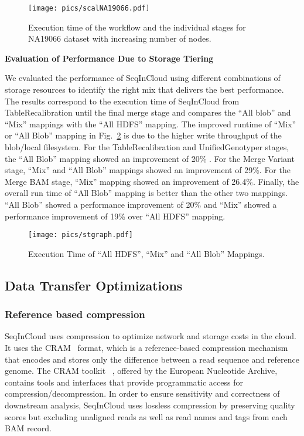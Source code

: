 \begin{figure}[!h]
  \centering
  \texttt{[image: pics/scalNA19066.pdf]}
  \caption{Execution time of the workflow and the individual stages for NA19066 dataset with increasing number of nodes.}
  \label{fig:scalNA19066}
\end{figure}
 
\noindent\textbf{Evaluation of Performance Due to Storage Tiering}

We evaluated the performance of SeqInCloud using different combinations of storage resources to identify the right mix that delivers the best performance.  The results correspond to the
execution time of SeqInCloud from TableRecalibration until the final merge stage and compares the ``All blob'' and ``Mix'' mappings with the ``All HDFS'' mapping.  The improved runtime of ``Mix'' or ``All Blob'' mapping in Fig.~\ref{fig:stgraph} is due to the higher write throughput of the blob/local filesystem.  For the TableRecalibration and UnifiedGenotyper stages, the ``All Blob'' mapping showed an improvement of 20\% . For the Merge Variant stage, ``Mix'' and ``All Blob'' mappings showed an improvement of 29\%. For the Merge BAM stage, ``Mix'' mapping showed an improvement of 26.4\%. Finally, the overall run time of ``All Blob'' mapping is better than the other two mappings. ``All Blob'' showed a performance improvement of 20\% and ``Mix'' showed a performance improvement of 19\% over ``All HDFS'' mapping.

\begin{figure}[!htbp]
  \centering
  \texttt{[image: pics/stgraph.pdf]}
  \caption{Execution Time of ``All HDFS'', ``Mix'' and ``All Blob'' Mappings.}
  \label{fig:stgraph}
\end{figure}

\subsection{Data Transfer Optimizations}

\subsubsection{Reference based compression}
\label{sec:compression}

SeqInCloud uses compression to optimize network and storage costs in the cloud. It uses the CRAM~\cite{CRAM} format, which is a reference-based compression mechanism that encodes and stores only the difference between a read sequence and reference genome. The CRAM toolkit~\cite{cramkit}
, offered by the European Nucleotide Archive, contains tools and interfaces that provide programmatic access for compression/decompression. In order to ensure sensitivity and
correctness of downstream analysis, SeqInCloud uses lossless compression by preserving quality scores but excluding unaligned reads as well as read names and tags from each BAM record.

